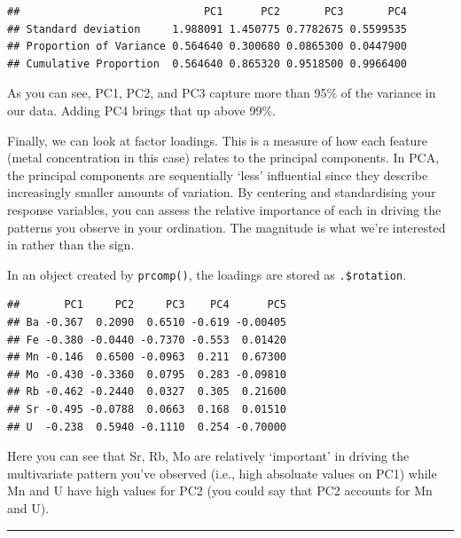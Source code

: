 \documentclass[
  11pt,
  a4paper,
]{book}
\newenvironment{Shaded}{\begin{snugshade}}{\end{snugshade}}
\newcommand{\CommentTok}[1]{\textcolor[rgb]{0.56,0.35,0.01}{\textit{#1}}}
\newcommand{\DecValTok}[1]{\textcolor[rgb]{0.00,0.00,0.81}{#1}}
\newcommand{\FunctionTok}[1]{\textcolor[rgb]{0.00,0.00,0.00}{#1}}
\newcommand{\NormalTok}[1]{#1}
\newcommand{\SpecialCharTok}[1]{\textcolor[rgb]{0.00,0.00,0.00}{#1}}
\begin{document}
\begin{verbatim}
##                             PC1      PC2       PC3       PC4
## Standard deviation     1.988091 1.450775 0.7782675 0.5599535
## Proportion of Variance 0.564640 0.300680 0.0865300 0.0447900
## Cumulative Proportion  0.564640 0.865320 0.9518500 0.9966400
\end{verbatim}

As you can see, PC1, PC2, and PC3 capture more than 95\% of the variance in our data. Adding PC4 brings that up above 99\%.

Finally, we can look at factor loadings. This is a measure of how each feature (metal concentration in this case) relates to the principal components. In PCA, the principal components are sequentially `less' influential since they describe increasingly smaller amounts of variation. By centering and standardising your response variables, you can assess the relative importance of each in driving the patterns you observe in your ordination. The magnitude is what we're interested in rather than the sign.

In an object created by \texttt{prcomp()}, the loadings are stored as \texttt{.\$rotation}.

\begin{Shaded}
\end{Shaded}

\begin{verbatim}
##       PC1     PC2     PC3    PC4      PC5
## Ba -0.367  0.2090  0.6510 -0.619 -0.00405
## Fe -0.380 -0.0440 -0.7370 -0.553  0.01420
## Mn -0.146  0.6500 -0.0963  0.211  0.67300
## Mo -0.430 -0.3360  0.0795  0.283 -0.09810
## Rb -0.462 -0.2440  0.0327  0.305  0.21600
## Sr -0.495 -0.0788  0.0663  0.168  0.01510
## U  -0.238  0.5940 -0.1110  0.254 -0.70000
\end{verbatim}

Here you can see that Sr, Rb, Mo are relatively `important' in driving the multivariate pattern you've observed (i.e., high absoluate values on PC1) while Mn and U have high values for PC2 (you could say that PC2 accounts for Mn and U).

\begin{center}\rule{0.5\linewidth}{0.5pt}\end{center}
\end{document}

